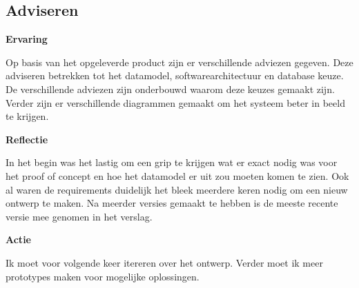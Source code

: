 \subsection{Adviseren}

\textbf{Ervaring}

\whitespace
Op basis van het opgeleverde product zijn er verschillende adviezen gegeven.
Deze adviseren betrekken tot het datamodel, softwarearchitectuur en database keuze.
De verschillende adviezen zijn onderbouwd waarom deze keuzes gemaakt zijn.
Verder zijn er verschillende diagrammen gemaakt om het systeem beter in beeld te krijgen.

\whitespace
\textbf{Reflectie}

\whitespace
In het begin was het lastig om een grip te krijgen wat er exact nodig was voor het proof of concept en hoe het datamodel er uit zou moeten komen te zien.
Ook al waren de requirements duidelijk het bleek meerdere keren nodig om een nieuw ontwerp te maken.
Na meerder versies gemaakt te hebben is de meeste recente versie mee genomen in het verslag.

\whitespace
\textbf{Actie}

\whitespace
Ik moet voor volgende keer itereren over het ontwerp.
Verder moet ik meer prototypes maken voor mogelijke oplossingen.
